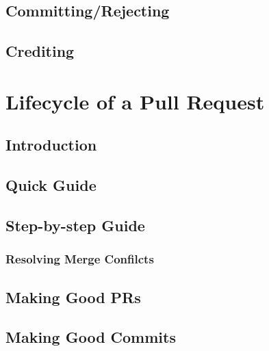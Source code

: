 \documentclass[]{book}
\begin{document}
\hypertarget{committingrejecting}{%
\section{Committing/Rejecting}\label{committingrejecting}}

\hypertarget{crediting}{%
\section{Crediting}\label{crediting}}

\hypertarget{lifecycle-of-a-pull-request-1}{%
\chapter{Lifecycle of a Pull Request}\label{lifecycle-of-a-pull-request-1}}

\hypertarget{introduction-1}{%
\section{Introduction}\label{introduction-1}}

\hypertarget{quick-guide-1}{%
\section{Quick Guide}\label{quick-guide-1}}

\hypertarget{step-by-step-guide-1}{%
\section{Step-by-step Guide}\label{step-by-step-guide-1}}

\hypertarget{resolving-merge-confilcts-1}{%
\subsection{Resolving Merge Confilcts}\label{resolving-merge-confilcts-1}}

\hypertarget{making-good-prs-1}{%
\section{Making Good PRs}\label{making-good-prs-1}}

\hypertarget{making-good-commits-1}{%
\section{Making Good Commits}\label{making-good-commits-1}}
\end{document}

